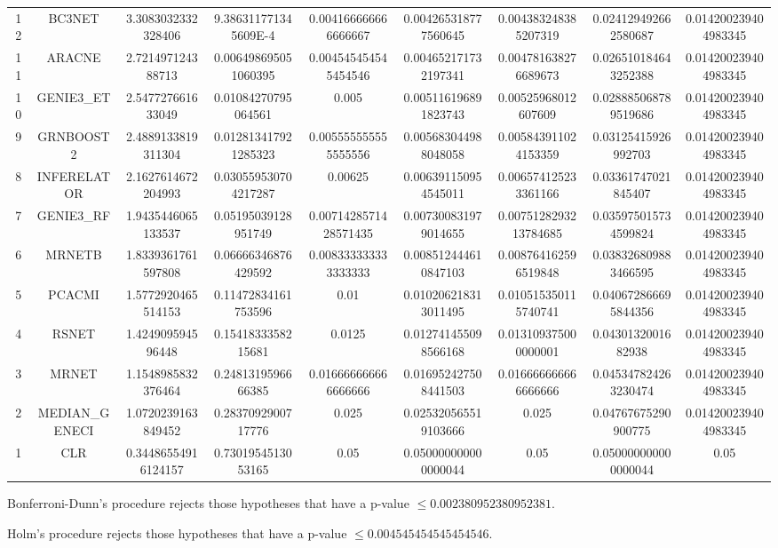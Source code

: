\documentclass[a4paper,10pt]{article}
\begin{document}
\begin{landscape}
\begin{table}[!htp]
\begin{tabular}{ccccccccc}
12&BC3NET&3.3083032332328406&9.386311771345609E-4&0.004166666666666667&0.004265318777560645&0.004383248385207319&0.024129492662580687&0.014200239404983345\\
11&ARACNE&2.721497124388713&0.006498695051060395&0.004545454545454546&0.004652171732197341&0.004781638276689673&0.026510184643252388&0.014200239404983345\\
10&GENIE3_ET&2.547727661633049&0.01084270795064561&0.005&0.005116196891823743&0.00525968012607609&0.028885068789519686&0.014200239404983345\\
9&GRNBOOST2&2.4889133819311304&0.012813417921285323&0.005555555555555556&0.005683044988048058&0.005843911024153359&0.03125415926992703&0.014200239404983345\\
8&INFERELATOR&2.1627614672204993&0.030559530704217287&0.00625&0.006391150954545011&0.006574125233361166&0.03361747021845407&0.014200239404983345\\
7&GENIE3_RF&1.9435446065133537&0.05195039128951749&0.0071428571428571435&0.007300831979014655&0.0075128293213784685&0.035975015734599824&0.014200239404983345\\
6&MRNETB&1.8339361761597808&0.06666346876429592&0.008333333333333333&0.008512444610847103&0.008764162596519848&0.038326809883466595&0.014200239404983345\\
5&PCACMI&1.5772920465514153&0.11472834161753596&0.01&0.010206218313011495&0.010515350115740741&0.040672866695844356&0.014200239404983345\\
4&RSNET&1.424909594596448&0.1541833358215681&0.0125&0.012741455098566168&0.013109375000000001&0.0430132001682938&0.014200239404983345\\
3&MRNET&1.1548985832376464&0.2481319596666385&0.016666666666666666&0.016952427508441503&0.016666666666666666&0.045347824263230474&0.014200239404983345\\
2&MEDIAN_GENECI&1.0720239163849452&0.2837092900717776&0.025&0.025320565519103666&0.025&0.04767675290900775&0.014200239404983345\\
1&CLR&0.34486554916124157&0.7301954513053165&0.05&0.050000000000000044&0.05&0.050000000000000044&0.05\\
\hline
\end{tabular}
\end{table}
Bonferroni-Dunn's procedure rejects those hypotheses that have a p-value $\le0.002380952380952381$.


Holm's procedure rejects those hypotheses that have a p-value $\le0.004545454545454546$.



\end{landscape}
\end{document}

